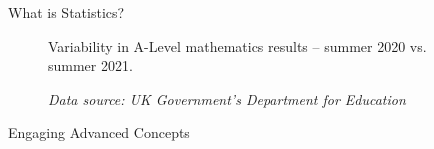 \documentclass[final]{beamer}
\begin{document}
\begin{frame}[t]{}
\begin{columns}[t]
\begin{column}{.3\textwidth}
\begin{block}{What is Statistics?}
\begin{figure}

					\caption{Variability in A-Level mathematics results – summer 2020 vs. summer 2021.}
					\caption*{\textit{\centering\scriptsize Data source: UK Government's Department for Education}}

				\end{figure}

				\vspace{0.5cm}
				
			\end{block}

			\vspace{0.5cm}

			\begin{block}{Engaging Advanced Concepts}

				\vspace{1.4cm}


\end{block}
\end{column}
\end{columns}
\end{frame}
\end{document}

